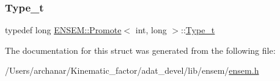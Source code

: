 \subsubsection{\texorpdfstring{Type\_t}{Type\_t}\hspace{0.1cm}{\footnotesize\ttfamily [2/2]}}
{\footnotesize\ttfamily typedef long \mbox{\hyperlink{structENSEM_1_1Promote}{E\+N\+S\+E\+M\+::\+Promote}}$<$ int, long $>$\+::\mbox{\hyperlink{structENSEM_1_1Promote_3_01int_00_01long_01_4_a54e18c0fbe5235d06120945bf82c21e4}{Type\+\_\+t}}}



The documentation for this struct was generated from the following file\+:\begin{DoxyCompactItemize}
\item 
/\+Users/archanar/\+Kinematic\+\_\+factor/adat\+\_\+devel/lib/ensem/\mbox{\hyperlink{lib_2ensem_2ensem_8h}{ensem.\+h}}\end{DoxyCompactItemize}
